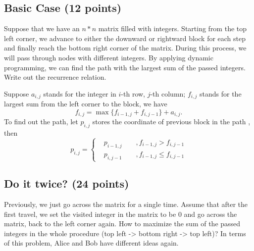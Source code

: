\documentclass[11pt]{exam}
\begin{document}
\subsection{Basic Case (12 points)}
\label{simple_repeat}
Suppose that we have an $n*n$ matrix filled with integers. Starting from the top left corner, we advance to either the downward or rightward block for each step and finally reach the bottom right corner of the matrix. During this process, we will pass through nodes with different integers. By applying dynamic programming, we can find the path with the largest sum of the passed integers. Write out the recurrence relation.
\begin{solution}
Suppose $a_{i,j}$ stands for the integer in $i$-th row, $j$-th column;
$f_{i,j}$ stands for the largest sum from the left corner to the block,
we have 
$$ f_{i,j} = \max \{f_{i-1,j}+f_{i,j-1}\} + a_{i,j}.$$
To find out the path, let $p_{i,j}$ stores the coordinate of previous block in the path
, then 
\begin{equation*}
    p_{i,j} = 
    \begin{cases}
        &p_{i-1,j}   \quad \quad ,f_{i-1,j}>f_{i,j-1}\\
        &p_{i,j-1}   \quad \quad ,f_{i-1,j}\leq f_{i,j-1}
    \end{cases}
\end{equation*}
\end{solution}
\subsection{Do it twice? (24 points)}
Previously, we just go across the matrix for a single time. Assume that after the first travel, we set the visited integer in the matrix to be 0 and go across the matrix, back to the left corner again. How to maximize the sum of the passed integers in the whole procedure (top left -> bottom right -> top left)? In terms of this problem, Alice and Bob have different ideas again.
\end{document}
